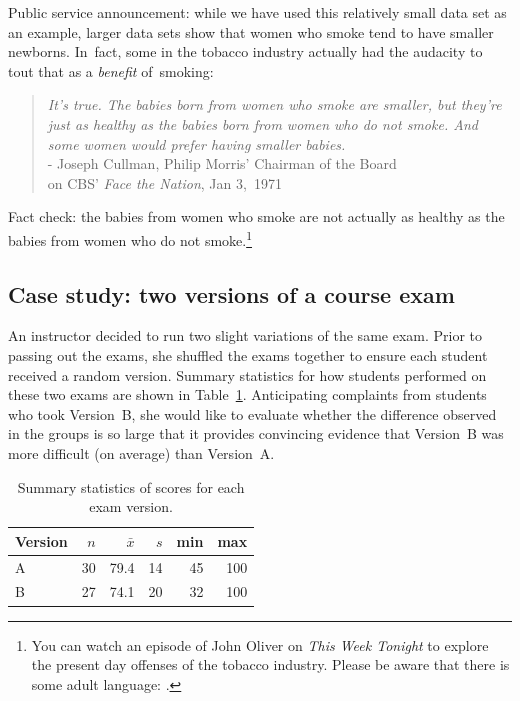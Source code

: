 {Public service announcement: while we have used this relatively small data set as an example, larger data sets show that women who smoke tend to have smaller newborns. In~fact, some in the tobacco industry actually had the audacity to tout that as a \emph{benefit} of~smoking:
\begin{quotation}
\noindent\emph{It's true. The babies born from women who smoke are smaller, but they're just as healthy as the babies born from women who do not smoke. And some women would prefer having smaller babies.} \\[2mm]
\indent\indent\indent\indent\indent\indent- Joseph Cullman, Philip Morris' Chairman of the Board \\
\indent\indent\indent\indent\indent{}on CBS' \emph{Face the Nation}, Jan 3,~1971
\end{quotation}
Fact check: the babies from women who smoke are not actually as healthy as the babies from women who do not smoke.\footnote{You can watch an episode of John Oliver on \emph{This Week Tonight} to explore the present day offenses of the tobacco industry. Please be aware that there is some adult language: .}



\subsection{Case study: two versions of a course exam}


An instructor decided to run two slight variations of the same exam. Prior to passing out the exams, she shuffled the exams together to ensure each student received a random version. Summary statistics for how students performed on these two exams are shown in Table~\ref{summaryStatsForTwoVersionsOfExams}. Anticipating complaints from students who took Version~B, she would like to evaluate whether the difference observed in the groups is so large that it provides convincing evidence that Version~B was more difficult (on average) than Version~A.

\begin{table}[hht]
\centering
\begin{tabular}{l rrrrr}
\hline
Version\hspace{2mm}	& $n$	& $\bar{x}$	& $s$	& min	& max  \\
\hline
A		& 30		& 79.4		& 14 	& 45		& 100 \\
B		& 27		& 74.1		& 20		& 32		& 100 \\
\hline
\end{tabular}
\caption{Summary statistics of scores for each exam version.}
\label{summaryStatsForTwoVersionsOfExams}
\end{table}

}
